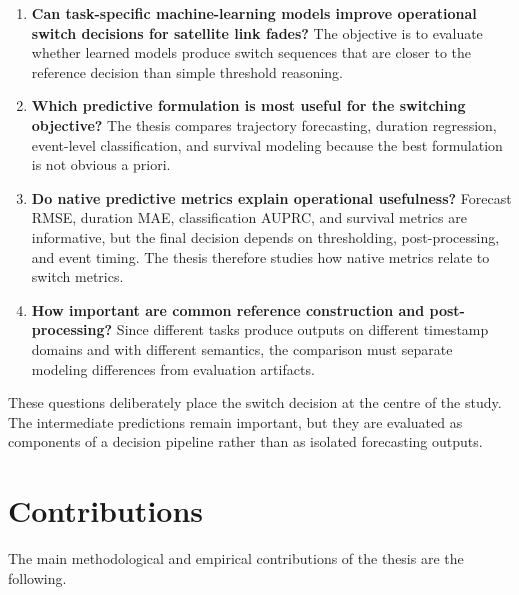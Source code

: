 \begin{enumerate}
  \item \textbf{Can task-specific machine-learning models improve operational
  switch decisions for satellite link fades?} The objective is to evaluate
  whether learned models produce switch sequences that are closer to the
  reference decision than simple threshold reasoning.

  \item \textbf{Which predictive formulation is most useful for the switching
  objective?} The thesis compares trajectory forecasting, duration regression,
  event-level classification, and survival modeling because the best
  formulation is not obvious a priori.

  \item \textbf{Do native predictive metrics explain operational usefulness?}
  Forecast RMSE, duration MAE, classification AUPRC, and survival metrics are
  informative, but the final decision depends on thresholding,
  post-processing, and event timing. The thesis therefore studies how native
  metrics relate to switch metrics.

  \item \textbf{How important are common reference construction and
  post-processing?} Since different tasks produce outputs on different
  timestamp domains and with different semantics, the comparison must separate
  modeling differences from evaluation artifacts.
\end{enumerate}

These questions deliberately place the switch decision at the centre of the
study. The intermediate predictions remain important, but they are evaluated
as components of a decision pipeline rather than as isolated forecasting
outputs.

\section{Contributions}
\label{sec:introduction-contributions}

The main methodological and empirical contributions of the thesis are the
following.

